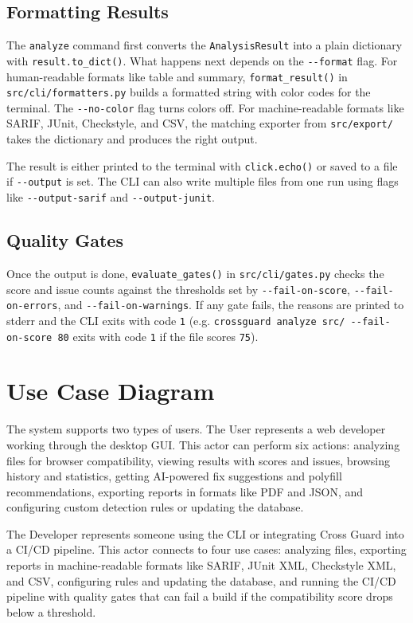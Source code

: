 \subsection{Formatting Results}

The \texttt{analyze} command first converts the \texttt{AnalysisResult} into a plain dictionary with \texttt{result.to\_dict()}. What happens next depends on the \texttt{-{}-format} flag. For human-readable formats like table and summary, \texttt{format\_result()} in \texttt{src/cli/formatters.py} builds a formatted string with color codes for the terminal. The \texttt{-{}-no-color} flag turns colors off. For machine-readable formats like SARIF, JUnit, Checkstyle, and CSV, the matching exporter from \texttt{src/export/} takes the dictionary and produces the right output.

The result is either printed to the terminal with \texttt{click.echo()} or saved to a file if \texttt{-{}-output} is set. The CLI can also write multiple files from one run using flags like \texttt{-{}-output-sarif} and \texttt{-{}-output-junit}.

\subsection{Quality Gates}

Once the output is done, \texttt{evaluate\_gates()} in \texttt{src/cli/gates.py} checks the score and issue counts against the thresholds set by \texttt{-{}-fail-on-score}, \texttt{-{}-fail-on-errors}, and \texttt{-{}-fail-on-warnings}. If any gate fails, the reasons are printed to stderr and the CLI exits with code \texttt{1} (e.g. \texttt{crossguard analyze src/ -{}-fail-on-score 80} exits with code \texttt{1} if the file scores \texttt{75}).

\section{Use Case Diagram}
\label{sec:usecase}

The system supports two types of users. The User represents a web developer working through the desktop GUI. This actor can perform six actions: analyzing files for browser compatibility, viewing results with scores and issues, browsing history and statistics, getting AI-powered fix suggestions and polyfill recommendations, exporting reports in formats like PDF and JSON, and configuring custom detection rules or updating the database.

The Developer represents someone using the CLI or integrating Cross Guard into a CI/CD pipeline. This actor connects to four use cases: analyzing files, exporting reports in machine-readable formats like SARIF, JUnit XML, Checkstyle XML, and CSV, configuring rules and updating the database, and running the CI/CD pipeline with quality gates that can fail a build if the compatibility score drops below a threshold.

